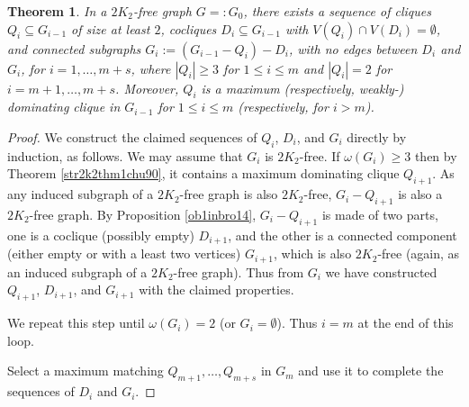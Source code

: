 \documentclass[12pt]{report}
\newtheorem{theorem}{Theorem}
\begin{document}
\begin{theorem}\label{lm5}
In a $2K_2$-free graph $G=:G_0$, there exists a sequence of cliques
$Q_i\subseteq G_{i-1}$ of size at least $2$, cocliques $D_i\subseteq G_{i-1}$
with $V(Q_i)\cap V(D_i)=\emptyset$,  
and connected subgraphs $G_{i}:=(G_{i-1}-Q_{i})-D_{i}$, with
no edges between $D_i$ and $G_i$,  for
$i=1,\ldots,m+s$, where
$|Q_i|\ge3$ for $1\le i\le m$ and $|Q_i|=2$ for $i=m+1,\ldots,m+s$.
Moreover, $Q_i$ is a maximum
(respectively, weakly-) dominating
clique in $G_{i-1}$ for $1\leq i\leq m$ (respectively, for $i>m$).
\end{theorem}
\begin{proof}
We construct the claimed sequences of $Q_i$, $D_i$, 
and $G_i$ directly by induction, as follows. 
We may assume that $G_i$ is $2K_2$-free.
If $\omega(G_i)\ge3$ then by Theorem \ref{str2k2thm1chu90}, it contains a 
maximum dominating clique $Q_{i+1}$.
As any induced subgraph of a $2K_2$-free
graph is also $2K_2$-free, $G_i-Q_{i+1}$ is also a $2K_2$-free graph.
By Proposition \ref{ob1inbro14}, $G_i-Q_{i+1}$ is made of two parts, one is a coclique
(possibly empty) $D_{i+1}$, and the other is a connected
component (either empty or with a least two vertices) $G_{i+1}$, which is also
$2K_2$-free (again, as an induced subgraph of a $2K_2$-free graph).
Thus from $G_i$ we have constructed $Q_{i+1}$, $D_{i+1}$, and $G_{i+1}$
with the  claimed properties.

We repeat this step until $\omega(G_i)=2$ (or $G_i=\emptyset$).
Thus $i=m$ at the end of this loop.


Select a maximum matching $Q_{m+1},\dots, Q_{m+s}$ in $G_m$
and use it to complete the sequences of $D_i$ and $G_i$. 
\end{proof}
\end{document}
